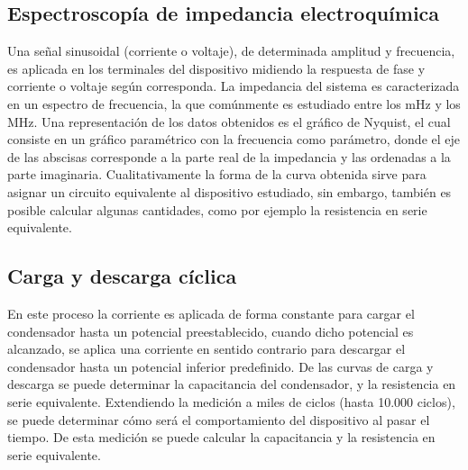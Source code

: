 \subsection{Espectroscopía de impedancia electroquímica}
Una señal sinusoidal (corriente o voltaje), de determinada amplitud y frecuencia, es aplicada en los terminales del dispositivo midiendo la respuesta de fase y corriente o voltaje según corresponda. La impedancia del sistema es caracterizada en un espectro de frecuencia, la que comúnmente es estudiado entre los mHz y los MHz. Una representación de los datos obtenidos es el gráfico de Nyquist, el cual consiste en un gráfico paramétrico con la frecuencia como parámetro, donde el eje de las abscisas corresponde a la parte real de la impedancia y las ordenadas a la parte imaginaria. Cualitativamente la forma de la curva obtenida sirve para asignar un circuito equivalente al dispositivo estudiado, sin embargo, también es posible calcular algunas cantidades, como por ejemplo la resistencia en serie equivalente.

\subsection{Carga y descarga cíclica}
En este proceso la corriente es aplicada de forma constante para cargar el condensador hasta un potencial preestablecido, cuando dicho potencial es alcanzado, se aplica una corriente en sentido contrario para descargar el condensador hasta un potencial inferior predefinido. De las curvas de carga y descarga se puede determinar la capacitancia del condensador, y la resistencia en serie equivalente. Extendiendo la medición a miles de ciclos (hasta 10.000 ciclos), se puede determinar cómo será el comportamiento del dispositivo al pasar el tiempo.
De esta medición se puede calcular la capacitancia y la resistencia en serie equivalente.